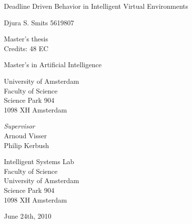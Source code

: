 \documentclass[11pt]{book}
\begin{document}
\begin{center}

\vspace{2.5cm}

\begin{Huge}
Deadline Driven Behavior in Intelligent Virtual Environments
\end{Huge}
\vspace{1.5cm}

Djura S. Smits
5619807

\vspace{1.5cm}

Master's thesis\\
Credits: 48 EC

\vspace{0.5cm}

Master's in Artificial Intelligence

\vspace{0.25cm}

University of Amsterdam\\
Faculty of Science\\
Science Park 904\\
1098 XH Amsterdam

\vspace{4cm}

\emph{Supervisor}\\
Arnoud Visser\\
Philip Kerbush

\vspace{0.25cm}

Intelligent Systems Lab\\
Faculty of Science\\
University of Amsterdam\\
Science Park 904\\
1098 XH  Amsterdam

\vspace{1.5cm}

June 24th, 2010

\end{center}
\newpage
\end{document}
